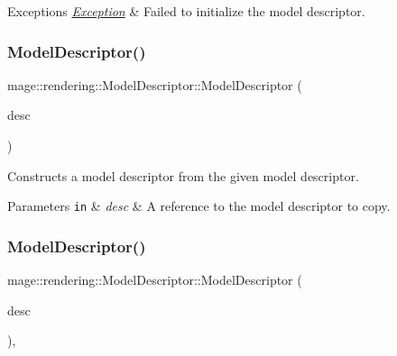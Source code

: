 \begin{DoxyExceptions}{Exceptions}
{\em \hyperlink{classmage_1_1_exception}{Exception}} & Failed to initialize the model descriptor. \\
\hline
\end{DoxyExceptions}
\hypertarget{classmage_1_1rendering_1_1_model_descriptor_af3fc0dea0060aa15a8003a7f4f807dd0}{}\label{classmage_1_1rendering_1_1_model_descriptor_af3fc0dea0060aa15a8003a7f4f807dd0} 
\subsubsection{\texorpdfstring{Model\+Descriptor()}{ModelDescriptor()}\hspace{0.1cm}{\footnotesize\ttfamily [2/3]}}
{\footnotesize\ttfamily mage\+::rendering\+::\+Model\+Descriptor\+::\+Model\+Descriptor (\begin{DoxyParamCaption}\item[{const \hyperlink{classmage_1_1rendering_1_1_model_descriptor}{Model\+Descriptor} \&}]{desc }\end{DoxyParamCaption})\hspace{0.3cm}{\ttfamily [delete]}}

Constructs a model descriptor from the given model descriptor.


\begin{DoxyParams}[1]{Parameters}
\mbox{\tt in}  & {\em desc} & A reference to the model descriptor to copy. \\
\hline
\end{DoxyParams}
\hypertarget{classmage_1_1rendering_1_1_model_descriptor_a0e7a576be083c9499a074cfd39acbcb7}{}\label{classmage_1_1rendering_1_1_model_descriptor_a0e7a576be083c9499a074cfd39acbcb7} 
\subsubsection{\texorpdfstring{Model\+Descriptor()}{ModelDescriptor()}\hspace{0.1cm}{\footnotesize\ttfamily [3/3]}}
{\footnotesize\ttfamily mage\+::rendering\+::\+Model\+Descriptor\+::\+Model\+Descriptor (\begin{DoxyParamCaption}\item[{\hyperlink{classmage_1_1rendering_1_1_model_descriptor}{Model\+Descriptor} \&\&}]{desc }\end{DoxyParamCaption})\hspace{0.3cm}{\ttfamily [default]}, {\ttfamily [noexcept]}}

